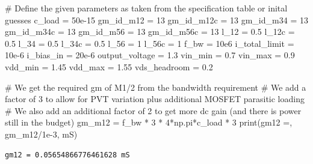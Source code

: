 \documentclass[
  a4paper,
  DIV=11,
  numbers=noendperiod]{scrartcl}
\newenvironment{Shaded}{\begin{snugshade}}{\end{snugshade}}
\newcommand{\BuiltInTok}[1]{\textcolor[rgb]{0.00,0.23,0.31}{#1}}
\newcommand{\CommentTok}[1]{\textcolor[rgb]{0.37,0.37,0.37}{#1}}
\newcommand{\DecValTok}[1]{\textcolor[rgb]{0.68,0.00,0.00}{#1}}
\newcommand{\FloatTok}[1]{\textcolor[rgb]{0.68,0.00,0.00}{#1}}
\newcommand{\NormalTok}[1]{\textcolor[rgb]{0.00,0.23,0.31}{#1}}
\newcommand{\OperatorTok}[1]{\textcolor[rgb]{0.37,0.37,0.37}{#1}}
\newcommand{\StringTok}[1]{\textcolor[rgb]{0.13,0.47,0.30}{#1}}
\begin{document}
\begin{tcolorbox}
\begin{Shaded}
\begin{Highlighting}[]
\CommentTok{\# Define the given parameters as taken from the specification table or inital guesses}
\NormalTok{c\_load }\OperatorTok{=} \FloatTok{50e{-}15}
\NormalTok{gm\_id\_m12 }\OperatorTok{=} \DecValTok{13}
\NormalTok{gm\_id\_m12c }\OperatorTok{=} \DecValTok{13}
\NormalTok{gm\_id\_m34 }\OperatorTok{=} \DecValTok{13}
\NormalTok{gm\_id\_m34c }\OperatorTok{=} \DecValTok{13}
\NormalTok{gm\_id\_m56 }\OperatorTok{=} \DecValTok{13}
\NormalTok{gm\_id\_m56c }\OperatorTok{=} \DecValTok{13}
\NormalTok{l\_12 }\OperatorTok{=} \FloatTok{0.5}
\NormalTok{l\_12c }\OperatorTok{=} \FloatTok{0.5}
\NormalTok{l\_34 }\OperatorTok{=} \FloatTok{0.5}
\NormalTok{l\_34c }\OperatorTok{=} \FloatTok{0.5}
\NormalTok{l\_56 }\OperatorTok{=} \DecValTok{1}
\NormalTok{l\_56c }\OperatorTok{=} \DecValTok{1}
\NormalTok{f\_bw }\OperatorTok{=} \FloatTok{10e6}
\NormalTok{i\_total\_limit }\OperatorTok{=} \FloatTok{10e{-}6}
\NormalTok{i\_bias\_in }\OperatorTok{=} \FloatTok{20e{-}6}
\NormalTok{output\_voltage }\OperatorTok{=} \FloatTok{1.3}
\NormalTok{vin\_min }\OperatorTok{=} \FloatTok{0.7}
\NormalTok{vin\_max }\OperatorTok{=} \FloatTok{0.9}
\NormalTok{vdd\_min }\OperatorTok{=} \FloatTok{1.45}
\NormalTok{vdd\_max }\OperatorTok{=} \FloatTok{1.55}
\NormalTok{vds\_headroom }\OperatorTok{=} \FloatTok{0.2}
\end{Highlighting}
\end{Shaded}

\begin{Shaded}
\begin{Highlighting}[]
\CommentTok{\# We get the required gm of M1/2 from the bandwidth requirement}
\CommentTok{\# We add a factor of 3 to allow for PVT variation plus additional MOSFET parasitic loading}
\CommentTok{\# We also add an additional factor of 2 to get more dc gain (and there is power still in the budget)}
\NormalTok{gm\_m12 }\OperatorTok{=}\NormalTok{ f\_bw }\OperatorTok{*} \DecValTok{3} \OperatorTok{*} \DecValTok{4}\OperatorTok{*}\NormalTok{np.pi}\OperatorTok{*}\NormalTok{c\_load }\OperatorTok{*} \DecValTok{3}
\BuiltInTok{print}\NormalTok{(}\StringTok{\textquotesingle{}gm12 =\textquotesingle{}}\NormalTok{, gm\_m12}\OperatorTok{/}\FloatTok{1e{-}3}\NormalTok{, }\StringTok{\textquotesingle{}mS\textquotesingle{}}\NormalTok{)}
\end{Highlighting}
\end{Shaded}

\begin{verbatim}
gm12 = 0.05654866776461628 mS
\end{verbatim}


\end{tcolorbox}
\end{document}
